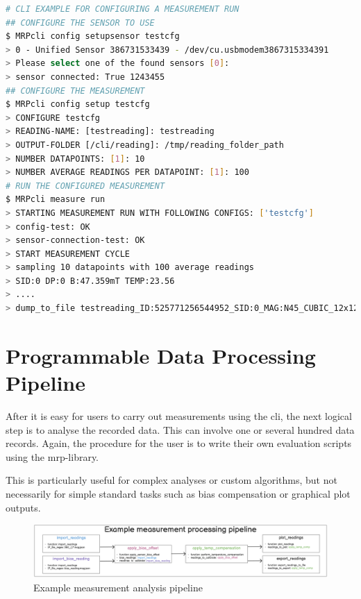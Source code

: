 \begin{lstlisting}[language=bash, caption={CLI example for configuring a measurement run}, label=lst:mrpcli_config_run]
# CLI EXAMPLE FOR CONFIGURING A MEASUREMENT RUN
## CONFIGURE THE SENSOR TO USE
$ MRPcli config setupsensor testcfg
> 0 - Unified Sensor 386731533439 - /dev/cu.usbmodem3867315334391
> Please select one of the found sensors [0]:
> sensor connected: True 1243455
## CONFIGURE THE MEASUREMENT
$ MRPcli config setup testcfg
> CONFIGURE testcfg
> READING-NAME: [testreading]: testreading
> OUTPUT-FOLDER [/cli/reading]: /tmp/reading_folder_path
> NUMBER DATAPOINTS: [1]: 10
> NUMBER AVERAGE READINGS PER DATAPOINT: [1]: 100
# RUN THE CONFIGURED MEASUREMENT
$ MRPcli measure run
> STARTING MEASUREMENT RUN WITH FOLLOWING CONFIGS: ['testcfg']
> config-test: OK
> sensor-connection-test: OK
> START MEASUREMENT CYCLE
> sampling 10 datapoints with 100 average readings
> SID:0 DP:0 B:47.359mT TEMP:23.56
> ....
> dump_to_file testreading_ID:525771256544952_SID:0_MAG:N45_CUBIC_12x12x12.mag.json
\end{lstlisting}

\hypertarget{programmable-data-processing-pipeline}{%
\section{Programmable Data Processing
Pipeline}\label{programmable-data-processing-pipeline}}

After it is easy for users to carry out measurements using the
\gls{cli}, the next logical step is to analyse the recorded data. This
can involve one or several hundred data records. Again, the procedure
for the user is to write their own evaluation scripts using the
\gls{mrp}-library.

This is particularly useful for complex analyses or custom algorithms,
but not necessarily for simple standard tasks such as bias compensation
or graphical plot outputs.

\begin{figure}
\centering
\includegraphics{./generated_images/border_Example_measurement_analysis_pipeline.png}
\caption{Example measurement analysis pipeline
\label{Example_measurement_analysis_pipeline.png}}
\end{figure}

